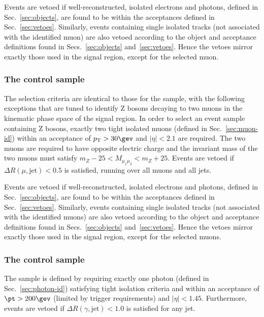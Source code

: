 Events are vetoed if well-reconstructed, isolated electrons and
photons, defined in Sec.~\ref{sec:objects}, are found to be within the
acceptances defined in Sec.~\ref{sec:vetoes}. Similarly, events
containing single isolated tracks (not associated with the identified
muon) are also vetoed according to the object and acceptance
definitions found in Secs.~\ref{sec:objects}
and~\ref{sec:vetoes}. Hence the vetoes mirror exactly those used in
the signal region, except for the selected muon.

\subsubsection{The \texorpdfstring{\mmj}{di-muon + jets} control sample}
\label{sec:mumucontrolSelection}

The selection criteria are identical to those for the \mj sample, with
the following exceptions that are tuned to identify Z bosons decaying
to two muons in the kinematic phase space of the signal region.  In
order to select an event sample containing Z bosons, exactly two tight
isolated muons (defined in Sec.~\ref{sec:muon-id}) within an
acceptance of $\Pt > 30\gev$ and $|\eta| < 2.1$ are required. The two
muons are required to have opposite electric charge and the invariant
mass of the two muons must satisfy $m_{Z} - 25 < M_{\mu_1\mu_2} <
m_{Z} +25$.  Events are vetoed if $\Delta R(\mu,\textrm{jet}) < 0.5$
is satisfied, running over all muons and all jets.

Events are vetoed if well-reconstructed, isolated electrons and
photons, defined in Sec.~\ref{sec:objects}, are found to be within the
acceptances defined in Sec.~\ref{sec:vetoes}. Similarly, events
containing single isolated tracks (not associated with the identified
muons) are also vetoed according to the object and acceptance
definitions found in Secs.~\ref{sec:objects}
and~\ref{sec:vetoes}. Hence the vetoes mirror exactly those used in
the signal region, except for the selected muons.

\subsubsection{The \texorpdfstring{\gj}{photon + jets} control sample}
\label{sec:photoncontrolSelection}

The \gj sample is defined by requiring exactly one photon (defined in
Sec.~\ref{sec:photon-id}) satisfying tight isolation criteria and
within an acceptance of $\pt > 200\gev$ (limited by trigger
requirements) and $|\eta| < 1.45$. Furthermore, events are vetoed if
$\Delta R(\gamma,\textrm{jet}) < 1.0$ is satisfied for any jet.

